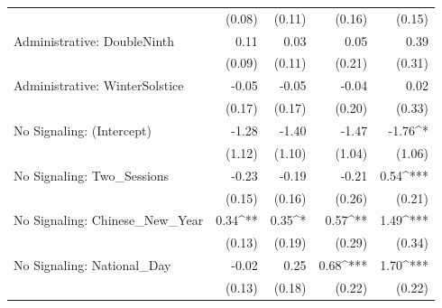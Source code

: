 \begin{table}
\begin{center}
\begin{tabular}{l D{.}{.}{6.5} D{.}{.}{6.5} D{.}{.}{6.5} D{.}{.}{6.5}}
                                                     & (0.08)                  & (0.11)                  & (0.16)                  & (0.15)                  \\
Administrative: DoubleNinth                          & 0.11                    & 0.03                    & 0.05                    & 0.39                    \\
                                                     & (0.09)                  & (0.11)                  & (0.21)                  & (0.31)                  \\
Administrative: WinterSolstice                       & -0.05                   & -0.05                   & -0.04                   & 0.02                    \\
                                                     & (0.17)                  & (0.17)                  & (0.20)                  & (0.33)                  \\
No Signaling: (Intercept)                            & -1.28                   & -1.40                   & -1.47                   & -1.76^{*}               \\
                                                     & (1.12)                  & (1.10)                  & (1.04)                  & (1.06)                  \\
No Signaling: Two\_Sessions                          & -0.23                   & -0.19                   & -0.21                   & 0.54^{***}              \\
                                                     & (0.15)                  & (0.16)                  & (0.26)                  & (0.21)                  \\
No Signaling: Chinese\_New\_Year                     & 0.34^{**}               & 0.35^{*}                & 0.57^{**}               & 1.49^{***}              \\
                                                     & (0.13)                  & (0.19)                  & (0.29)                  & (0.34)                  \\
No Signaling: National\_Day                          & -0.02                   & 0.25                    & 0.68^{***}              & 1.70^{***}              \\
                                                     & (0.13)                  & (0.18)                  & (0.22)                  & (0.22)                  \\

\end{tabular}
\end{center}
\end{table}
